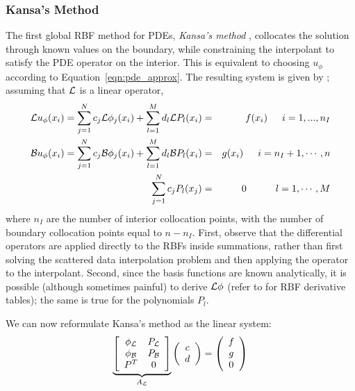 \documentclass[11pt]{report}
\begin{document}
{\subsubsection{Kansa's Method}

The first global RBF method for PDEs, \emph{Kansa's method} \cite{Kansa1990a, Kansa1990b}, collocates the solution through known values on the boundary, while constraining the interpolant to satisfy the PDE operator on the interior. This is equivalent to choosing $u_\phi$ according to Equation~\ref{eqn:pde_approx}. The resulting system is given by \cite{Mouat2002}; assuming that $\mathcal{L}$ is a linear operator, 
\begin{eqnarray}
\mathcal{L}u_\phi(x_i) = \sum_{j=1}^{N}c_j\mathcal{L}\phi_j(x_i) + \sum_{l=1}^{M}d_l \mathcal{L}P_l(x_i) &=&f(x_i)  \hskip1.5em i = 1,...,n_I  \label{eqn:kansa_interior} \\ 
\mathcal{B}u_\phi(x_i) = \sum_{j=1}^{N}c_j \mathcal{B}\phi_j(x_i) + \sum_{l=1}^{M}d_l \mathcal{B}P_l(x_i) &=& g(x_i)  \hskip1.5em i = n_I + 1, \cdots, n \label{eqn:kansa_boundary} \\
\sum_{j=1}^{N} c_j P_l(x_j) & = & 0 \hskip3.0em l=1,\cdots,M \label{eqn:kansa_constraints} 
\end{eqnarray}
where $n_I$ are the number of interior collocation points, with the number of boundary collocation points equal to $n - n_I$. First, observe that the differential operators are applied directly to the RBFs inside summations, rather than first solving the scattered data interpolation problem and then applying the operator to the interpolant.  Second, since the basis functions are known analytically, it is possible (although sometimes painful) to derive $\mathcal{L}\phi$ (refer to \cite{Fasshauer2007} for RBF derivative tables); the same is true for the polynomials $P_l$. 

We can now reformulate Kansa's method as the linear system: 
\begin{eqnarray}
\underbrace{\left[ \begin{array}{c c} 
	\phi_{\mathcal{L}} & P_{\mathcal{L}} \\
	\phi_{\mathcal{B}} & P_{\mathcal{B}} \\
	P^T & 0
	\end{array} \right]}_{A_{\mathcal{L}}}  \left( \begin{array}{c}
							{c} \\
							{d}
							 \end{array}
						 \right) = \left( \begin{array}{c}
							{f} \\
							{g} \\
							0
							 \end{array}
						 \right) 
	\label{eqn:kansa_method}
\end{eqnarray}


}
\end{document}
